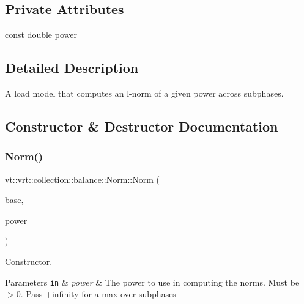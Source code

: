 \subsection*{Private Attributes}
\begin{DoxyCompactItemize}
\item 
const double \hyperlink{classvt_1_1vrt_1_1collection_1_1balance_1_1_norm_a03090310a3420b16ee581541cb261661}{power\+\_\+}
\end{DoxyCompactItemize}


\subsection{Detailed Description}
A load model that computes an l-\/norm of a given power across subphases. 

\subsection{Constructor \& Destructor Documentation}
\mbox{\label{classvt_1_1vrt_1_1collection_1_1balance_1_1_norm_a054625ebe2a8dcd9f986f36f40b70ada}} 
\subsubsection{\texorpdfstring{Norm()}{Norm()}}
{\footnotesize\ttfamily vt\+::vrt\+::collection\+::balance\+::\+Norm\+::\+Norm (\begin{DoxyParamCaption}\item[{std\+::shared\+\_\+ptr$<$ \hyperlink{structvt_1_1vrt_1_1collection_1_1balance_1_1_load_model}{balance\+::\+Load\+Model} $>$}]{base,  }\item[{double}]{power }\end{DoxyParamCaption})}



Constructor. 


\begin{DoxyParams}[1]{Parameters}
\mbox{\tt in}  & {\em power} & The power to use in computing the norms. Must be $>$0. Pass +infinity for a {\ttfamily max} over subphases \\
\hline
\end{DoxyParams}


